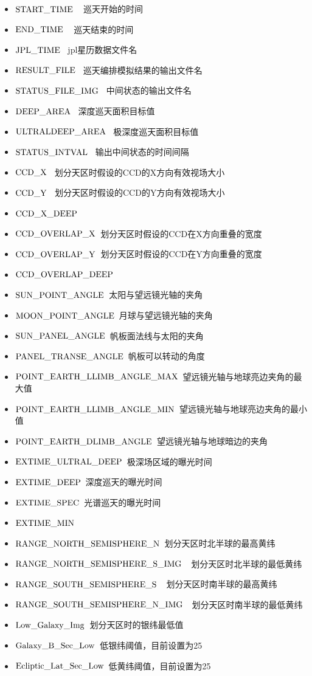 \documentclass[a4paper,11pt]{ctexart}
\newcommand{\RT}[1]{\textcolor{red}{#1}}
\begin{document}
\begin{itemize}
\item  $\rm START\_TIME$ ~ 巡天开始的时间
\item  $\rm END\_TIME$ ~ 巡天结束的时间
\item $\rm JPL\_TIME$ ~jpl星历数据文件名
\item $\rm RESULT\_FILE$ ~巡天编排模拟结果的输出文件名
\item \RT{$\rm STATUS\_FILE\_IMG$} ~中间状态的输出文件名
\item \RT{$\rm DEEP\_AREA$} ~深度巡天面积目标值
\item \RT{$\rm ULTRALDEEP\_AREA$} ~极深度巡天面积目标值
\item \RT{$\rm STATUS\_INTVAL$} ~输出中间状态的时间间隔

\item $\rm CCD\_X$ ~划分天区时假设的CCD的X方向有效视场大小
\item $\rm CCD\_Y$ ~划分天区时假设的CCD的Y方向有效视场大小
\item \RT{$\rm CCD\_X\_DEEP$}~
\item $\rm CCD\_OVERLAP\_X$~划分天区时假设的CCD在X方向重叠的宽度
\item $\rm CCD\_OVERLAP\_Y$~划分天区时假设的CCD在Y方向重叠的宽度
\item \RT{$\rm CCD\_OVERLAP\_DEEP$}~
\item $\rm SUN\_POINT\_ANGLE$~太阳与望远镜光轴的夹角
\item $\rm MOON\_POINT\_ANGLE$~月球与望远镜光轴的夹角
\item $\rm SUN\_PANEL\_ANGLE$~帆板面法线与太阳的夹角
\item $\rm PANEL\_TRANSE\_ANGLE$~帆板可以转动的角度

\item $\rm POINT\_EARTH\_LLIMB\_ANGLE\_MAX$~望远镜光轴与地球亮边夹角的最大值
\item $\rm POINT\_EARTH\_LLIMB\_ANGLE\_MIN$~望远镜光轴与地球亮边夹角的最小值
\item $\rm POINT\_EARTH\_DLIMB\_ANGLE$~望远镜光轴与地球暗边的夹角
\item $\rm EXTIME\_ULTRAL\_DEEP$~极深场区域的曝光时间
\item $\rm EXTIME\_DEEP$~深度巡天的曝光时间
\item $\rm EXTIME\_SPEC$~光谱巡天的曝光时间
\item \RT{$\rm EXTIME\_MIN$}~

\item $\rm RANGE\_NORTH\_SEMISPHERE\_N$~划分天区时北半球的最高黄纬
\item $\rm RANGE\_NORTH\_SEMISPHERE\_S\_IMG$~~划分天区时北半球的最低黄纬
\item $\rm RANGE\_SOUTH\_SEMISPHERE\_S$~~划分天区时南半球的最高黄纬
\item $\rm RANGE\_SOUTH\_SEMISPHERE\_N\_IMG$~~划分天区时南半球的最低黄纬
\item $\rm Low\_Galaxy\_Img$~划分天区时的银纬最低值
\item $\rm Galaxy\_B\_Sec\_Low$~低银纬阈值，目前设置为25\textdegree
\item $\rm Ecliptic\_Lat\_Sec\_Low$~低黄纬阈值，目前设置为25\textdegree


\end{itemize}
\end{document}
